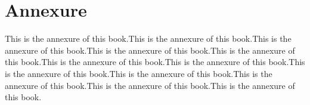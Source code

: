 \documentclass{book}
\begin{document}
\chapter{Annexure}
\setcounter{page}{1}

This is the annexure of this book.This is the annexure of this book.This is the annexure of this book.This is the annexure of this book.This is the annexure of this book.This is the annexure of this book.This is the annexure of this book.This is the annexure of this book.This is the annexure of this book.This is the annexure of this book.This is the annexure of this book.This is the annexure of this book.
\end{document}
